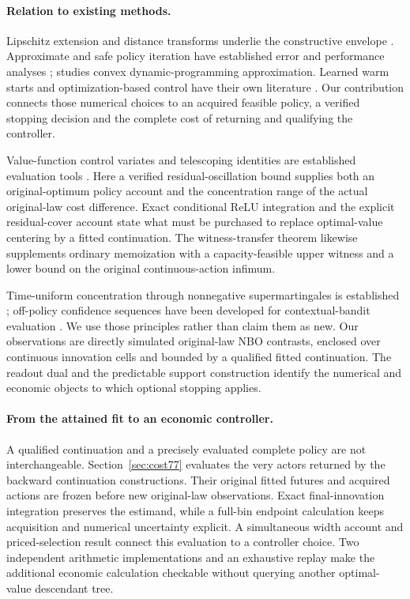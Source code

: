 \documentclass[ecta,nameyear,draft]{econsocart}
\begin{document}
\paragraph{Relation to existing methods.}
Lipschitz extension and distance transforms underlie the constructive envelope \citep{mcshane1934,felzenszwalb2012}. Approximate and safe policy iteration have established error and performance analyses \citep{munos2003,pirotta2013,scherrer2015}; \citet{yang2020convex} studies convex dynamic-programming approximation. Learned warm starts and optimization-based control have their own literature \citep{sakaue2023warm,sambharya2023,agrawal2020control}. Our contribution connects those numerical choices to an acquired feasible policy, a verified stopping decision and the complete cost of returning and qualifying the controller.

Value-function control variates and telescoping identities are established evaluation tools \citep{munos2006variance,jiang2016}. Here a verified residual-oscillation bound supplies both an original-optimum policy account and the concentration range of the actual original-law cost difference. Exact conditional ReLU integration and the explicit residual-cover account state what must be purchased to replace optimal-value centering by a fitted continuation. The witness-transfer theorem likewise supplements ordinary memoization with a capacity-feasible upper witness and a lower bound on the original continuous-action infimum.

Time-uniform concentration through nonnegative supermartingales is established \citep{howard2020time}; off-policy confidence sequences have been developed for contextual-bandit evaluation \citep{karampatziakis2021}. We use those principles rather than claim them as new. Our observations are directly simulated original-law NBO contrasts, enclosed over continuous innovation cells and bounded by a qualified fitted continuation. The readout dual and the predictable support construction identify the numerical and economic objects to which optional stopping applies.

\paragraph{From the attained fit to an economic controller.}
A qualified continuation and a precisely evaluated complete policy are not interchangeable. Section~\ref{sec:cost77} evaluates the very actors returned by the backward continuation constructions. Their original fitted futures and acquired actions are frozen before new original-law observations. Exact final-innovation integration preserves the estimand, while a full-bin endpoint calculation keeps acquisition and numerical uncertainty explicit. A simultaneous width account and priced-selection result connect this evaluation to a controller choice. Two independent arithmetic implementations and an exhaustive replay make the additional economic calculation checkable without querying another optimal-value descendant tree.
\end{document}
